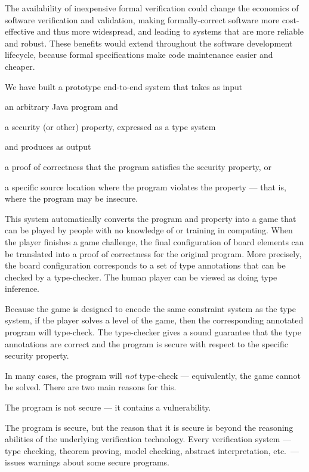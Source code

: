 \documentclass[preprint]{sig-alternate}
\let\Itemize =\itemize
\let\Enumerate =\enumerate
\def\Nospacing{\itemsep=0pt\topsep=0pt\partopsep=0pt\parskip=0pt\parsep=0pt}
\renewenvironment{itemize}{\Itemize\Nospacing}{\endlist}
\renewenvironment{enumerate}{\Enumerate\Nospacing}{\endlist}
\begin{document}
The availability of inexpensive formal verification could change the
economics of software verification and validation, making
formal\-ly-correct software more cost-effective and thus more
widespread, and  leading to systems that are more reliable and
robust.  
These benefits would extend throughout the software
development lifecycle, because formal specifications make code
maintenance easier and cheaper.


We have built a prototype end-to-end system that takes as input

\begin{itemize}
\item
 an arbitrary Java program and
\item
 a security (or other) property, expressed as a type system
\end{itemize}

\noindent
and produces as output

\begin{itemize}
\item
 a proof of correctness that the program satisfies the security property,
 or
\item
 a specific source location where the program violates the property
 --- that is, where the program may be insecure.
\end{itemize}

This system automatically converts the program and
property into a game that can be played by people with no knowledge of
or training in computing.  When the player finishes a game challenge,
the final configuration of board elements can be translated into a
proof of correctness for the original program.  More precisely, the
board configuration corresponds to a set of type annotations that can
be checked by a type-checker.  The human player can be viewed as doing
type inference.

Because the game is designed to encode the same constraint system as
the type system, if the player solves a level of the game, then the
corresponding annotated program will type-check.  The type-checker
gives a sound guarantee that the type annotations are correct and the
program is secure with respect to the specific security property.

In many cases, the program will \emph{not} type-check ---
equivalently, the game cannot be solved.  There are two main reasons
for this.

\begin{enumerate}
\item
  The program is not secure --- it contains a vulnerability.
\item
  The program is secure, but the reason that it is secure is beyond
  the reasoning abilities of the underlying verification technology.
  Every verification system --- type checking, theorem proving, model
  checking, abstract interpretation, etc.\ --- issues warnings about
  some secure programs.
\end{enumerate}
\end{document}
